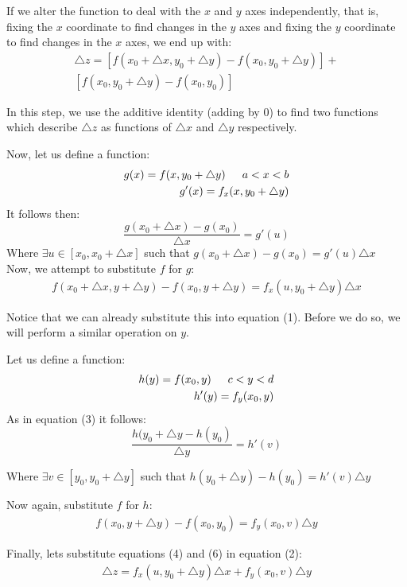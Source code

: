 \documentclass[12pt]{article}
\begin{document}
If we alter the function to deal with the \(x\) and \(y\) axes independently, that is, fixing the \(x\) coordinate to find changes in the \(y\) axes and fixing the \(y\) coordinate to find changes in the \(x\) axes, we end up with:
\begin{align}
	\triangle z = [f(x_0 + \triangle x, y_0 + \triangle y) - f(x_0,y_0 + \triangle y)] + \\ \nonumber[f(x_0,y_0+ \triangle y) - f(x_0,y_0)]
\end{align}

In this step, we use the additive identity (adding by 0) to find two functions which describe \(\triangle z\) as functions of \(\triangle x\) and \(\triangle y\) respectively.

Now, let us define a function:
\begin{align}
	g(x) = f(x,y_0 + \triangle y)\indent a < x < b\\
\nonumber	g'(x) = f_x(x,y_0 + \triangle y)
\end{align}
It follows then:
\[
	\frac{g(x_0 + \triangle x) - g(x_0)}{\triangle x} = g'(u)
\]
Where \(\exists u \in [x_0,x_0+\triangle x]\) such that \(g(x_0 + \triangle x) - g(x_0) = g'(u)\triangle x\)\\
Now, we attempt to substitute \(f\) for \(g\): 
\begin{align}
	f(x_0 + \triangle x, y + \triangle y) - f(x_0, y + \triangle y) = f_x(u, y_0 + \triangle y)\triangle x
\end{align}

Notice that we can already substitute this into equation (1). Before we do so, we will perform a similar operation on \(y\).

Let us define a function:
\begin{align}
	h(y) = f(x_0,y) \indent c < y < d\\
	\nonumber h'(y) = f_y(x_0,y)
\end{align}
As in equation (3) it follows:
\[
	\frac{h(y_0 + \triangle y - h(y_0)}{\triangle y} = h'(v)
\]

Where \(\exists v \in [y_0, y_0 + \triangle y]\) such that \(h(y_0 + \triangle y) - h(y_0) = h'(v)\triangle y\)

Now again, substitute \(f\) for \(h\):
\begin{align}
	f(x_0,y+\triangle y) - f(x_0, y_0) = f_y(x_0,v)\triangle y
\end{align}

Finally, lets substitute equations (4) and (6) in equation (2):
\begin{align}
	\triangle z = f_x(u,y_0 + \triangle y)\triangle x + f_y(x_0,v)\triangle y
\end{align}
\end{document}

